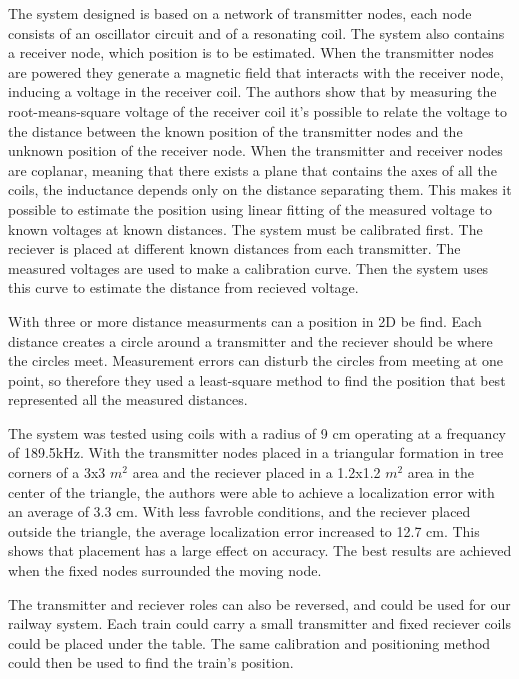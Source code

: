 The system designed is based on a network of transmitter nodes, each node consists of an oscillator circuit and of a resonating coil.
The system also contains a receiver node, which position is to be estimated.
When the transmitter nodes are powered they generate a magnetic field that interacts with the receiver node, inducing a voltage in the receiver coil.
The authors show that by measuring the root-means-square voltage of the receiver coil it's possible to relate the voltage to the distance between the known position of the transmitter nodes and the unknown position of the receiver node.
When the transmitter and receiver nodes are coplanar, meaning that there exists a plane that contains the axes of all the coils, the inductance depends only on the distance separating them. 
This makes it possible to estimate the position using linear fitting of the measured voltage to known voltages at known distances.
The system must be calibrated first. The reciever is placed at different known distances from each transmitter. The measured voltages are used to make a calibration curve. Then the system uses this curve to estimate the distance from recieved voltage.

With three or more distance measurments can a position in 2D be find. Each distance creates a circle around a transmitter and the reciever should be where the circles meet. Measurement errors can disturb the circles from meeting at one point, so therefore they used a least-square method to find the position that best represented all the measured distances.

The system was tested using coils with a radius of 9 cm operating at a frequancy of 189.5kHz.
With the transmitter nodes placed in a triangular formation in tree corners of a 3x3 $m^2$ area and the reciever placed in a 1.2x1.2 $m^2$ area in the center of the triangle, the authors were able to achieve a localization error with an average of 3.3 cm.
With less favroble conditions, and the reciever placed outside the triangle, the average localization error increased to 12.7 cm. This shows that placement has a large effect on accuracy. The best results are achieved when the fixed nodes surrounded the moving node. 

The transmitter and reciever roles can also be reversed, and could be used for our railway system. Each train could carry a small transmitter and fixed reciever coils could be placed under the table. The same calibration and positioning method could then be used to find the train's position.




